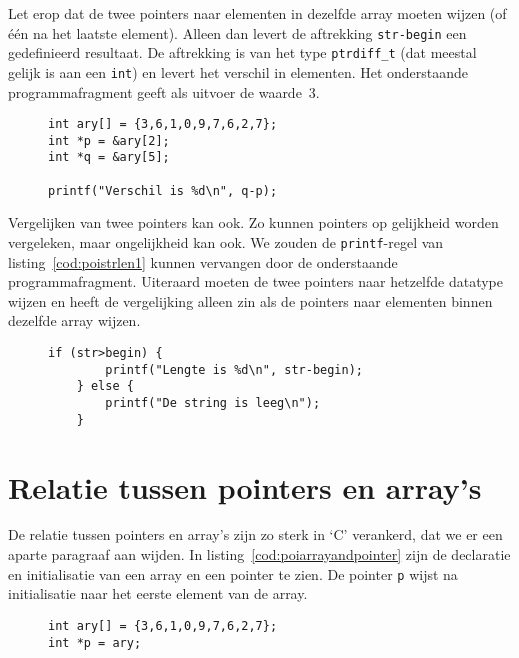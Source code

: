 Let erop dat de twee pointers naar elementen in dezelfde array moeten wijzen (of één na het laatste element). Alleen dan levert de aftrekking \texttt{str-begin} een gedefinieerd resultaat. De aftrekking is van het type \texttt{ptrdiff\_t} (dat meestal gelijk is aan een \texttt{int}) en levert het verschil in elementen. Het onderstaande programmafragment geeft als uitvoer de waarde~3.

\begin{figure}[!ht]
\begin{lstlisting}[caption=Het berekenen van het verschil van twee pointers.]
int ary[] = {3,6,1,0,9,7,6,2,7};
int *p = &ary[2];
int *q = &ary[5];

printf("Verschil is %d\n", q-p);
\end{lstlisting}
\end{figure}

Vergelijken van twee pointers kan ook. Zo kunnen pointers op gelijkheid worden vergeleken, maar ongelijkheid kan ook. We zouden de \texttt{printf}-regel van listing~\ref{cod:poistrlen1} kunnen vervangen door de onderstaande programmafragment.
Uiteraard moeten de twee pointers naar hetzelfde datatype wijzen en heeft de vergelijking alleen zin als de pointers naar elementen binnen dezelfde array wijzen.

\begin{figure}[!ht]
\begin{lstlisting}[caption=Vergelijken van twee pointers.]
    if (str>begin) {
        printf("Lengte is %d\n", str-begin);
    } else {
        printf("De string is leeg\n");
    }
\end{lstlisting}
\end{figure}


\section{Relatie tussen pointers en array's}
\label{sec:relatietussenpointersenarrays}
De relatie tussen pointers en array's zijn zo sterk in `C' verankerd, dat we er een aparte paragraaf aan wijden. In listing~\ref{cod:poiarrayandpointer} zijn de declaratie en initialisatie van een array en een pointer te zien. De pointer \texttt{p} wijst na initialisatie naar het eerste element van de array.

\begin{figure}[!ht]
\begin{lstlisting}[caption=Declaratie en initialisatie van een array en een pointer.,label=cod:poiarrayandpointer]
int ary[] = {3,6,1,0,9,7,6,2,7};
int *p = ary;
\end{lstlisting}
\end{figure}


